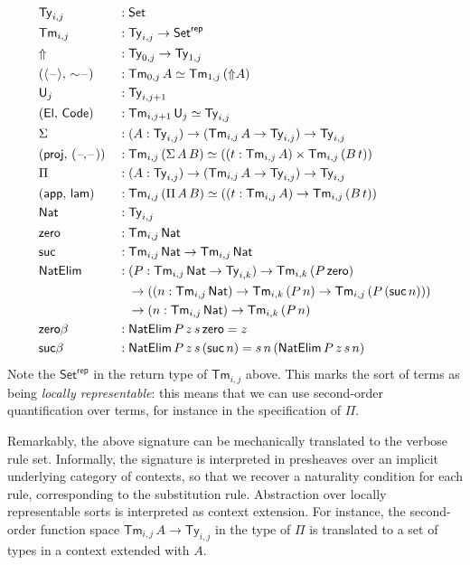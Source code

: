 \documentclass[acmsmall,screen]{acmart}
\newcommand{\msf}[1]{\mathsf{#1}}
\newcommand{\Code}{\msf{Code}}
\newcommand{\El}{\msf{El}}
\newcommand{\lam}{\msf{lam}}
\newcommand{\app}{\msf{app}}
\newcommand{\Lift}{{\Uparrow}}
\newcommand{\spl}{{\sim}}
\newcommand{\qut}[1]{\langle #1\rangle}
\renewcommand{\U}{\msf{U}}
\newcommand{\Ty}{\msf{Ty}}
\newcommand{\Tm}{\msf{Tm}}
\newcommand{\Nat}{\msf{Nat}}
\newcommand{\zero}{\msf{zero}}
\newcommand{\suc}{\msf{suc}}
\newcommand{\Set}{\mathsf{Set}}
\newcommand{\blank}{{\mathord{\hspace{1pt}\text{--}\hspace{1pt}}}}
\theoremstyle{remark}
\begin{document}
\begingroup
\allowdisplaybreaks
\begin{alignat*}{5}
  &\Ty_{i,j} &&: \Set\\
  &\Tm_{i,j} &&: \Ty_{i,j} \to \Set^{\msf{rep}} \\
  &\Lift    &&: \Ty_{0,j} \to \Ty_{1,j} \\
  &(\qut{\blank},\,\spl{\blank}) &&: \Tm_{0,j}\,A \simeq \Tm_{1,j}\,(\Lift A)\\
  &\U_j     &&: \Ty_{i,j+1}\\
  &(\El,\,\Code) &&: \Tm_{i,j+1}\,\U_j \simeq \Ty_{i,j}\\
  & \Sigma &&: (A : \Ty_{i,j}) \to (\Tm_{i,j}\,A \to \Ty_{i,j}) \to \Ty_{i,j} \\
  &(\msf{proj},\,(\blank\!,\!\blank)) &&: \Tm_{i,j}\,(\Sigma\,A\,B) \simeq ((t : \Tm_{i,j}\,A) \times \Tm_{i,j}\,(B\,t))\\
  &\Pi &&: (A : \Ty_{i,j}) \to (\Tm_{i,j}\,A \to \Ty_{i,j}) \to \Ty_{i,j}\\
  &(\app,\,\lam) &&: \Tm_{i,j}\,(\Pi\,A\,B) \simeq ((t : \Tm_{i,j}\,A) \to \Tm_{i,j}\,(B\,t))\\
  &\Nat &&: \Ty_{i,j} \\
  &\zero &&: \Tm_{i,j}\,\Nat \\
  &\suc  &&: \Tm_{i,j}\,\Nat \to \Tm_{i,j}\,\Nat \\
  &\msf{NatElim} &&: (P : \Tm_{i,j}\,\Nat \to \Ty_{i,k}) \to \Tm_{i,k}\,(P\,\zero) \\
  & && \hspace{0.8em}\to ((n : \Tm_{i,j}\,\Nat) \to \Tm_{i,k}\,(P\,n) \to \Tm_{i,j}\,(P\,(\suc\,n))) \\
  & && \hspace{0.8em}\to (n : \Tm_{i,j}\,\Nat) \to \Tm_{i,k}\,(P\,n)\\
  & \zero\beta &&: \msf{NatElim}\,P\,z\,s\,\zero = z \\
  & \suc\beta  &&: \msf{NatElim}\,P\,z\,s\,(\suc\,n) = s\,n\,(\msf{NatElim}\,P\,z\,s\,n)
\end{alignat*}
\endgroup
Note the $\Set^{\msf{rep}}$ in the return type of $\Tm_{i,j}$ above. This marks
the sort of terms as being \emph{locally representable}: this means that we can use
second-order quantification over terms, for instance in the specification of $\Pi$.

Remarkably, the above signature can be mechanically translated to the verbose
rule set. Informally, the signature is interpreted in presheaves over an
implicit underlying category of contexts, so that we recover a naturality
condition for each rule, corresponding to the substitution rule. Abstraction
over locally representable sorts is interpreted as context extension. For
instance, the second-order function space $\Tm_{i,j}\,A \to \Ty_{i,j}$ in the
type of $\Pi$ is translated to a set of types in a context extended with $A$.



\end{document}
